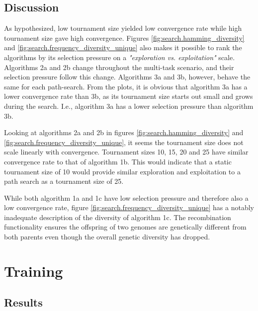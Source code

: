 \subsection{Discussion}
As hypothesized, low tournament size yielded low convergence rate while high tournament size gave high convergence. Figures \ref{fig:search.hamming_diversity} and \ref{fig:search.frequency_diversity_unique} also makes it possible to rank the algorithms by its selection pressure on a \textit{"exploration vs. exploitation"} scale. Algorithms 2a and 2b change throughout the multi-task scenario, and their selection pressure follow this change. Algorithms 3a and 3b, however, behave the same for each path-search. From the plots, it is obvious that algorithm 3a has a lower convergence rate than 3b, as its tournament size starts out small and grows during the search. I.e., algorithm 3a has a lower selection pressure than algorithm 3b. 

Looking at algorithms 2a and 2b in figures \ref{fig:search.hamming_diversity} and \ref{fig:search.frequency_diversity_unique}, it seems the tournament size does not scale linearly with convergence. Tournament sizes 10, 15, 20 and 25 have similar convergence rate to that of algorithm 1b. This would indicate that a static tournament size of 10 would provide similar exploration and exploitation to a path search as a tournament size of 25. 

While both algorithm 1a and 1c have low selection pressure and therefore also a low convergence rate, figure \ref{fig:search.frequency_diversity_unique} has a notably inadequate description of the diversity of algorithm 1c. The recombination functionality ensures the offspring of two genomes are genetically different from both parents even though the overall genetic diversity has dropped.

\section{Training}

\subsection{Results}

